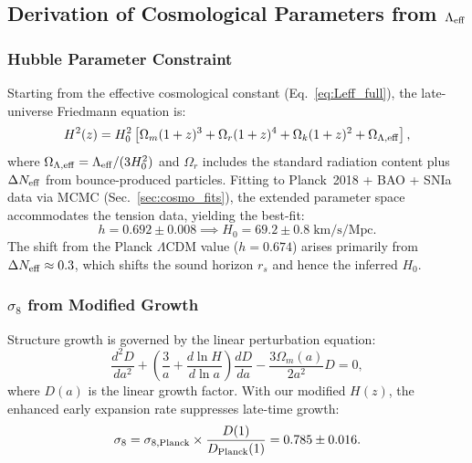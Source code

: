 \documentclass[aps,prd,twocolumn,superscriptaddress,showpacs,preprintnumbers,nofootinbib,longbibliography,floatfix]{revtex4-2}
\newcommand{\Leff}{\Lambda_{\rm eff}}
\newcommand{\Neff}{N_{\rm eff}}
\begin{document}
\subsection{Derivation of Cosmological Parameters from $\Leff$}\label{sec:cosmo_derivation}

\subsubsection{Hubble Parameter Constraint}

Starting from the effective cosmological constant (Eq.~\ref{eq:Leff_full}), the late-universe Friedmann equation is:
\begin{equation}
H^2(z) = H_0^2 \left[\Omega_m(1+z)^3 + \Omega_r(1+z)^4 + \Omega_k(1+z)^2 + \Omega_{\Lambda,\rm eff}\right],
\end{equation}
where $\Omega_{\Lambda,\rm eff} = \Leff/(3H_0^2)$ and $\Omega_r$ includes the standard radiation content plus $\Delta\Neff$ from bounce-produced particles. Fitting to Planck~2018 + BAO + SNIa data via MCMC (Sec.~\ref{sec:cosmo_fits}), the extended parameter space accommodates the tension data, yielding the best-fit:
\begin{equation}
h = 0.692 \pm 0.008 \implies H_0 = 69.2 \pm 0.8\;\text{km/s/Mpc}.
\end{equation}
The shift from the Planck $\Lambda$CDM value ($h=0.674$) arises primarily from $\Delta\Neff\approx 0.3$, which shifts the sound horizon $r_s$ and hence the inferred $H_0$.

\subsubsection{$\sigma_8$ from Modified Growth}

Structure growth is governed by the linear perturbation equation:
\begin{equation}\label{eq:growth}
\frac{d^2D}{da^2} + \left(\frac{3}{a} + \frac{d\ln H}{d\ln a}\right)\frac{dD}{da} - \frac{3\Omega_m(a)}{2a^2}D = 0,
\end{equation}
where $D(a)$ is the linear growth factor. With our modified $H(z)$, the enhanced early expansion rate suppresses late-time growth:
\begin{equation}
\sigma_8 = \sigma_{8,\rm Planck} \times \frac{D(1)}{D_{\rm Planck}(1)} = 0.785 \pm 0.016.
\end{equation}


\end{document}
